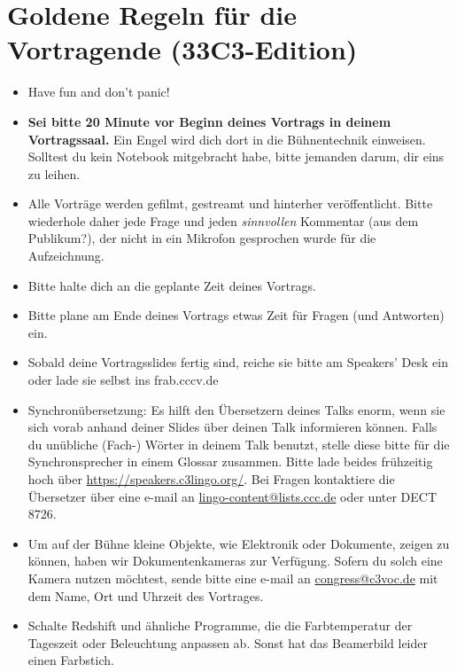 \documentclass[paper=a4]{scrartcl}
\begin{document}
\section*{Goldene Regeln für die Vortragende (33C3-Edition)}
\begin{itemize}
	\item Have fun and don't panic!
	\item \textbf{Sei bitte 20 Minute vor Beginn deines Vortrags in deinem Vortragssaal.} Ein Engel wird dich dort in die Bühnentechnik einweisen. Solltest du kein Notebook mitgebracht habe, bitte jemanden darum, dir eins zu leihen.
	\item Alle Vorträge werden gefilmt, gestreamt und hinterher veröffentlicht. Bitte wiederhole daher jede Frage und jeden \textit{sinnvollen} Kommentar (aus dem Publikum?), der nicht in ein Mikrofon gesprochen wurde für die Aufzeichnung.
	\item Bitte halte dich an die geplante Zeit deines Vortrags.
	\item Bitte plane am Ende deines Vortrags etwas Zeit für Fragen (und Antworten) ein.
	\item Sobald deine Vortragsslides fertig sind, reiche sie bitte am Speakers' Desk ein oder lade sie selbst ins frab.cccv.de
	\item Synchronübersetzung: Es hilft den Übersetzern deines Talks enorm, wenn sie sich vorab anhand deiner Slides über deinen Talk informieren können. Falls du unübliche (Fach-\nobreak) Wörter in deinem Talk benutzt, stelle diese bitte für die Synchronsprecher in einem Glossar zusammen. Bitte lade beides frühzeitig hoch über \url{https://speakers.c3lingo.org/}. Bei Fragen kontaktiere die Übersetzer über eine e-mail an \url{lingo-content@lists.ccc.de} oder unter DECT 8726.
	\item Um auf der Bühne kleine Objekte, wie Elektronik oder Dokumente, zeigen zu können, haben wir Dokumentenkameras zur Verfügung. Sofern du solch eine Kamera nutzen möchtest, sende bitte eine e-mail an \url{congress@c3voc.de} mit dem Name, Ort und Uhrzeit des Vortrages.
	\item Schalte Redshift und ähnliche Programme, die die Farbtemperatur der Tageszeit oder Beleuchtung anpassen ab. Sonst hat das Beamerbild leider einen Farbstich.
\end{itemize}
\end{document}
